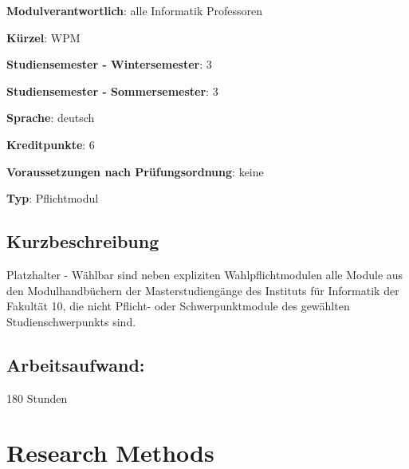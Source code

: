 \begin{modulHead}
\textbf{Modulverantwortlich}: alle Informatik
Professoren
\end{modulHead}
\begin{modulHead}
\textbf{Kürzel}:
WPM
\end{modulHead}
\begin{modulHead}
\textbf{Studiensemester -
Wintersemester}:
3
\end{modulHead}
\begin{modulHead}
\textbf{Studiensemester -
Sommersemester}: 3
\end{modulHead}
\begin{modulHead}
\textbf{Sprache}:
deutsch
\end{modulHead}
\begin{modulHead}
\textbf{Kreditpunkte}:
6
\end{modulHead}
\begin{modulHead}
\textbf{Voraussetzungen nach
Prüfungsordnung}: keine
\end{modulHead}
\begin{modulHead}
\textbf{Typ}:
Pflichtmodul
\end{modulHead}


\section*{Kurzbeschreibung}\label{kurzbeschreibung-6}

Platzhalter - Wählbar sind neben expliziten Wahlpflichtmodulen alle
Module aus den Modulhandbüchern der Masterstudiengänge des Instituts für
Informatik der Fakultät 10, die nicht Pflicht- oder Schwerpunktmodule
des gewählten Studienschwerpunkts sind.

\section*{Arbeitsaufwand:}\label{arbeitsaufwand-8}

180 Stunden

\chapter{Research Methods}\label{research-methods}

